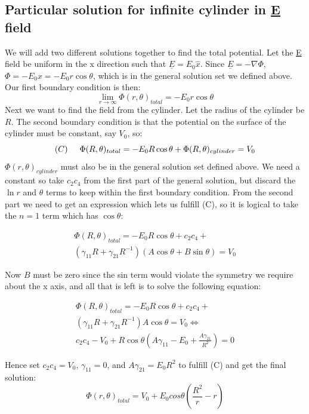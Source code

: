 \documentclass[aps,twocolumn,pre,nofootinbib,10pt]{revtex4-1}
\begin{document}
\subsection{Particular solution for infinite cylinder in \underline{E} field}
We will add two different solutions together to find the total potential. Let the \underline{E} field be uniform in the x direction
such that $\underline{E} = E_0 \hat{x}$. Since $\underline{E} = - \nabla \Phi$, $\Phi = -E_0 x = -E_0 r \cos\theta$, which is
in the general solution set we defined above.
Our first
boundary condition is then:
\[ \lim_{r \rightarrow \infty} \Phi(r,\theta)_{total} = -E_0 r \cos\theta \]
Next we want to find the field from the cylinder. Let the radius of the cylinder be $R$.
The second boundary condition is that the potential on the surface of the cylinder must be constant,
say $V_0$, so:
\[ (C) \hspace{0.5cm} \Phi(R,\theta)_{total} = -E_0 R \cos\theta + \Phi(R,\theta)_{cylinder} = V_0 \]
$\Phi(r,\theta)_{cylinder}$ must also be in the general solution set defined above. We need a constant so take $c_2 c_4$ from the first
part of the general solution, but discard the
$\ln r$ and $\theta$ terms to keep within the first boundary condition.
From the second part we need to get an expression which lets us fulfill (C), so it is logical to take the $n = 1$ term which has $\cos\theta$:

\begin{gather*}
 \Phi(R,\theta)_{total} = -E_0 R \cos\theta +  c_2 c_4 + \\
(\gamma_{11} R + \gamma_{21} R^{-1}) (A\cos\theta + B \sin\theta) = V_0 
\end{gather*}

Now $B$ must be zero since the sin term would violate the symmetry we require about the x axis, and all that is left is to solve the following equation:

\begin{gather*}
 \Phi(R,\theta)_{total} = -E_0 R \cos\theta + c_2 c_4 + \\
(\gamma_{11} R + \gamma_{21} R^{-1}) A\cos\theta = V_0 \Leftrightarrow \\
 c_2 c_4 - V_0 + R \cos\theta \left( A\gamma_{11} - E_0 + \frac{A\gamma_{21}}{R^2} \right) = 0 
\end{gather*}

Hence set $c_2 c_4 = V_0$, $\gamma_{11} = 0$, and $A\gamma_{21} = E_0 R^2$ to fulfill (C) and get the final solution:
\[ \Phi(r,\theta)_{total} = V_0 + E_0 cos\theta \left( \frac{R^2}{r} - r \right) \]
\end{document}

